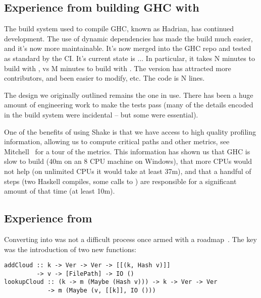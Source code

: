 \subsection{Experience from building GHC with \Shake}


The build system used to compile GHC, known as Hadrian, has continued
development. The use of dynamic dependencies has made the build much easier, and
it's now more maintainable. It's now merged into the GHC repo and tested as
standard by the CI. It's current state is ... In particular, it takes N minutes
to build with \Shake, vs M minutes to build with \Make. The \Shake version has
attracted more contributors, and been easier to modify, etc. The code is N
lines.

The design we originally outlined remains the one in use. There has been a huge
amount of engineering work to make the tests pass (many of the details encoded
in the \Make build system were incidental -- but some were essential).

One of the benefits of using Shake is that we have access to high quality
profiling information, allowing us to compute critical paths and other metrics,
see Mitchell~ for a tour of the metrics.
This information has shown us that GHC is slow to build (40m on an 8 CPU machine
on Windows), that more CPUs would not help (on unlimited CPUs it would take at
least 37m), and that a handful of steps (two Haskell compiles, some calls to
) are responsible for a significant amount of that time (at least
10m).

\subsection{Experience from \Cloud \Shake}\label{sec-cloud-shake}

Converting \Shake into \Cloud \Shake was not a difficult process once armed with
a roadmap~\cite{mokhov2018buildsystems}. The key was the introduction of two new
functions:

\vspace{1mm}
\begin{verbatim}
addCloud :: k -> Ver -> Ver -> [[(k, Hash v)]]
         -> v -> [FilePath] -> IO ()
lookupCloud :: (k -> m (Maybe (Hash v))) -> k -> Ver -> Ver
            -> m (Maybe (v, [[k]], IO ()))
\end{verbatim}
\vspace{1mm}

